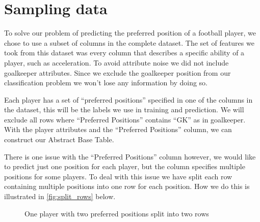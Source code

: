 \section{Sampling data}

To solve our problem of predicting the preferred position of a football player, we chose to use a subset of columns in the complete dataset. The set of features we took from this dataset was every column that describes a specific ability of a player, such as acceleration. To avoid attribute noise we did not include goalkeeper attributes. Since we exclude the goalkeeper position from our classification problem we won't lose any information by doing so. 
\par
Each player has a set of ``preferred positions'' specified in one of the columns in the dataset, this will be the labels we use in training and prediction. We will exclude all rows where ``Preferred Positions'' contains ``GK'' as in goalkeeper. With the player attributes and the ``Preferred Positions'' column, we can construct our Abstract Base Table.
\par
There is one issue with the ``Preferred Positions'' column however, we would like to predict just one position for each player, but the column specifies multiple positions for some players. To deal with this issue we have split each row containing multiple positions into one row for each position. How we do this is illustrated in \autoref{fig:split_rows} below.
\begin{figure}[!ht]
    \centering
    \caption{One player with two preferred positions split into two rows}\label{fig:split_rows}
\end{figure}
